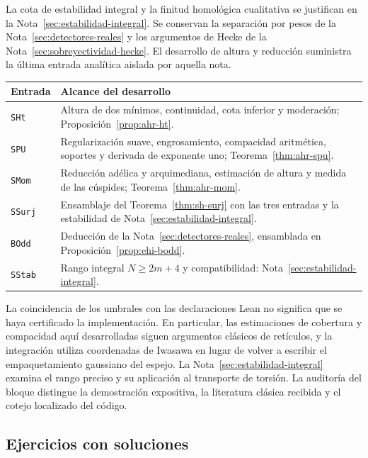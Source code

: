 La cota de estabilidad integral y la finitud homológica cualitativa se justifican en la Nota~\ref{sec:estabilidad-integral}. Se conservan la separación por pesos de la Nota~\ref{sec:detectores-reales} y los argumentos de Hecke de la Nota~\ref{sec:sobreyectividad-hecke}. El desarrollo de altura y reducción suministra la última entrada analítica aislada por aquella nota.

\begin{center}\small
\begin{tabularx}{\textwidth}{@{}p{}Y@{}}
\toprule
Entrada & Alcance del desarrollo\\\midrule
\texttt{SHt} & Altura de dos mínimos, continuidad, cota inferior y moderación; Proposición~\ref{prop:ahr-ht}.\\
\texttt{SPU} & Regularización suave, engrosamiento, compacidad aritmética, soportes y derivada de exponente uno; Teorema~\ref{thm:ahr-spu}.\\
\texttt{SMom} & Reducción adélica y arquimediana, estimación de altura y medida de las cúspides; Teorema~\ref{thm:ahr-mom}.\\
\texttt{SSurj} & Ensamblaje del Teorema~\ref{thm:sh-surj} con las tres entradas y la estabilidad de Nota~\ref{sec:estabilidad-integral}.\\
\texttt{BOdd} & Deducción de la Nota~\ref{sec:detectores-reales}, ensamblada en Proposición~\ref{prop:ehi-bodd}.\\
\texttt{SStab} & Rango integral $N\ge2m+4$ y compatibilidad: Nota~\ref{sec:estabilidad-integral}.\\\bottomrule
\end{tabularx}
\end{center}

La coincidencia de los umbrales con las declaraciones Lean no significa que se haya certificado la implementación. En particular, las estimaciones de cobertura y compacidad aquí desarrolladas siguen argumentos clásicos de retículos, y la integración utiliza coordenadas de Iwasawa en lugar de volver a escribir el empaquetamiento gaussiano del espejo. La Nota~\ref{sec:estabilidad-integral} examina el rango preciso y su aplicación al transporte de torsión. La auditoría del bloque distingue la demostración expositiva, la literatura clásica recibida y el cotejo localizado del código.

\clearpage
\subsection{Ejercicios con soluciones}

